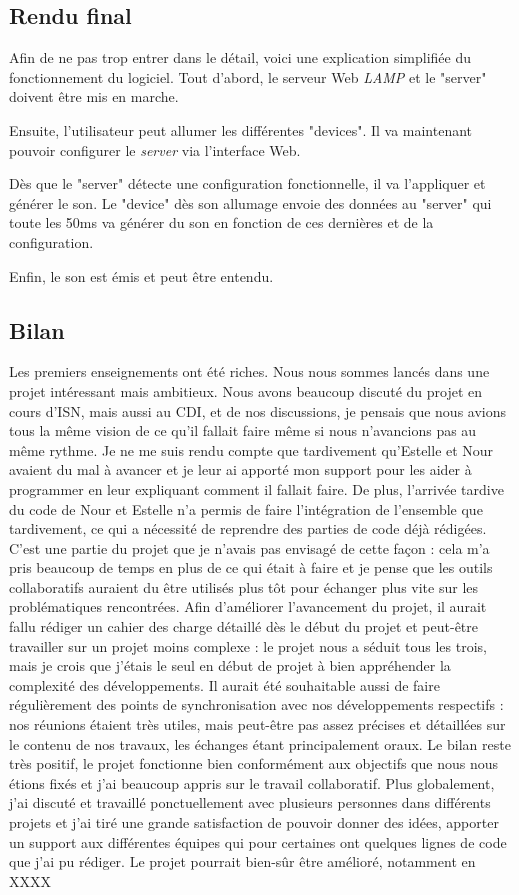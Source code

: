 \documentclass[12pt]{article}
\begin{document}
	\subsection{Rendu final}
	Afin de ne pas trop entrer dans le détail, voici une explication simplifiée du fonctionnement du logiciel. Tout d'abord,  le serveur Web \textit{LAMP} et le "server" doivent être mis en marche. 
	
	Ensuite, l'utilisateur peut allumer les différentes "devices". Il va maintenant pouvoir configurer le \textit{server} via l'interface Web.
	
	Dès que le "server" détecte une configuration fonctionnelle, il va l'appliquer et générer le son. Le "device" dès son allumage envoie des données au "server" qui toute les 50ms va générer du son en fonction de ces dernières et de la configuration.
	
	Enfin, le son est émis et peut être entendu.
	\subsection{Bilan}
	Les premiers enseignements ont été riches. Nous nous sommes lancés dans une projet intéressant mais ambitieux. Nous avons beaucoup discuté du projet en cours d'ISN, mais aussi au CDI, et de nos discussions, je pensais que nous avions tous la même vision de ce qu'il fallait faire même si nous n'avancions pas au même rythme. Je ne me suis rendu compte que tardivement qu'Estelle et Nour avaient du mal à avancer et je leur ai apporté mon support pour les aider à programmer en leur expliquant comment il fallait faire.
	De plus, l'arrivée tardive du code de Nour et Estelle n'a permis de faire l'intégration de l'ensemble que tardivement, ce qui a nécessité de reprendre des parties de code déjà rédigées. C'est une partie du projet que je n'avais pas envisagé de cette façon : cela m'a pris beaucoup de temps en plus de ce qui était à faire et je pense que les outils collaboratifs auraient du être utilisés plus tôt pour échanger plus vite sur les problématiques rencontrées.
	Afin d'améliorer l'avancement du projet, il aurait fallu rédiger un cahier des charge détaillé dès le début du projet et peut-être travailler sur un projet moins complexe : le projet nous a séduit tous les trois, mais je crois que j'étais le seul en début de projet à bien appréhender la complexité des développements.
	Il aurait été souhaitable aussi de faire régulièrement des points de synchronisation avec nos développements respectifs : nos réunions étaient très utiles, mais peut-être pas assez précises et détaillées sur le contenu de nos travaux, les échanges étant principalement oraux.
	Le bilan reste très positif, le projet fonctionne bien conformément aux objectifs que nous nous étions fixés et j'ai beaucoup appris sur le travail collaboratif. Plus globalement, j'ai discuté et travaillé ponctuellement avec plusieurs personnes dans différents projets et j'ai tiré une grande satisfaction de pouvoir donner des idées, apporter un support aux différentes équipes qui pour certaines ont quelques lignes de code que j'ai pu rédiger.  
	Le projet pourrait bien-sûr être amélioré, notamment en XXXX
	
\end{document}
